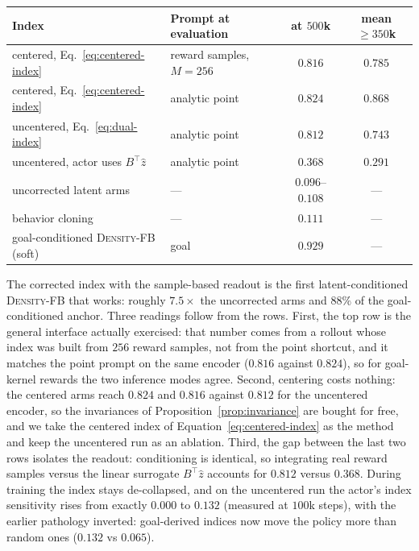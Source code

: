 \documentclass{article}
\newcommand{\DensityFB}{\textsc{Density-FB}}
\begin{document}
\begin{center}
\small
\setlength{\tabcolsep}{4pt}
\begin{tabular}{llcc}
\toprule
Index & Prompt at evaluation & at $500$k & mean $\ge 350$k \\
\midrule
centered, Eq.~\ref{eq:centered-index} & reward samples, $M{=}256$ & $\mathbf{0.816}$ & $0.785$ \\
centered, Eq.~\ref{eq:centered-index} & analytic point & $0.824$ & $0.868$ \\
uncentered, Eq.~\ref{eq:dual-index} & analytic point & $0.812$ & $0.743$ \\
uncentered, actor uses $B^\top \hat z$ & analytic point & $0.368$ & $0.291$ \\
\midrule
uncorrected latent arms & --- & $0.096$--$0.108$ & --- \\
behavior cloning & --- & $0.111$ & --- \\
goal-conditioned \DensityFB{} (soft) & goal & $0.929$ & --- \\
\bottomrule
\end{tabular}
\end{center}

The corrected index with the sample-based readout is the first latent-conditioned \DensityFB{} that works: roughly $7.5\times$ the uncorrected arms and $88\%$ of the goal-conditioned anchor.
Three readings follow from the rows.
First, the top row is the general interface actually exercised: that number comes from a rollout whose index was built from $256$ reward samples, not from the point shortcut, and it matches the point prompt on the same encoder ($0.816$ against $0.824$), so for goal-kernel rewards the two inference modes agree.
Second, centering costs nothing: the centered arms reach $0.824$ and $0.816$ against $0.812$ for the uncentered encoder, so the invariances of Proposition~\ref{prop:invariance} are bought for free, and we take the centered index of Equation~\ref{eq:centered-index} as the method and keep the uncentered run as an ablation.
Third, the gap between the last two rows isolates the readout: conditioning is identical, so integrating real reward samples versus the linear surrogate $B^\top\hat z$ accounts for $0.812$ versus $0.368$.
During training the index stays de-collapsed, and on the uncentered run the actor's index sensitivity rises from exactly $0.000$ to $0.132$ (measured at $100$k steps), with the earlier pathology inverted: goal-derived indices now move the policy more than random ones ($0.132$ vs $0.065$).
\end{document}
